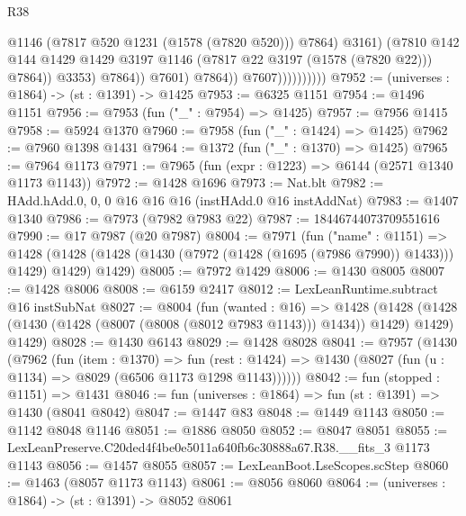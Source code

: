 \begin{lexlean}{R38}
\begin{coremodule}
                                          @1146
                                          (@7817 @520 @1231 (@1578 (@7820 @520)))
                                          @7864)
                                        @3161)
                                      (@7810
                                        @142
                                        @144
                                        @1429
                                        @1429
                                        @3197
                                        @1146
                                        (@7817 @22 @3197 (@1578 (@7820 @22)))
                                        @7864))
                                    @3353)
                                  @7864))
                              @7601)
                            @7864))
                        @7607))))))))))
@7952 := (universes : @1864) -> (st : @1391) -> @1425
@7953 := @6325 @1151
@7954 := @1496 @1151
@7956 := @7953 (fun ("_" : @7954) => @1425)
@7957 := @7956 @1415
@7958 := @5924 @1370
@7960 := @7958 (fun ("_" : @1424) => @1425)
@7962 := @7960 @1398 @1431
@7964 := @1372 (fun ("_" : @1370) => @1425)
@7965 := @7964 @1173
@7971 := @7965 (fun (expr : @1223) => @6144 (@2571 @1340 @1173 @1143))
@7972 := @1428 @1696
@7973 := Nat.blt
@7982 := HAdd.hAdd.{0, 0, 0} @16 @16 @16 (instHAdd.{0} @16 instAddNat)
@7983 := @1407 @1340
@7986 := @7973 (@7982 @7983 @22)
@7987 := 18446744073709551616
@7990 := @17 @7987 (@20 @7987)
@8004 := @7971
    (fun ("name" : @1151) =>
    @1428 (@1428 (@1428 (@1430 (@7972 (@1428 (@1695 (@7986 @7990)) @1433))) @1429) @1429) @1429)
@8005 := @7972 @1429
@8006 := @1430 @8005
@8007 := @1428 @8006
@8008 := @6159 @2417
@8012 := LexLeanRuntime.subtract @16 instSubNat
@8027 := @8004
    (fun (wanted : @16) =>
    @1428
      (@1428 (@1428 (@1430 (@1428 (@8007 (@8008 (@8012 @7983 @1143))) @1434)) @1429) @1429)
      @1429)
@8028 := @1430 @6143
@8029 := @1428 @8028
@8041 := @7957
    (@1430
      (@7962
        (fun (item : @1370) =>
        fun (rest : @1424) => @1430 (@8027 (fun (u : @1134) => @8029 (@6506 @1173 @1298 @1143))))))
@8042 := fun (stopped : @1151) => @1431
@8046 := fun (universes : @1864) => fun (st : @1391) => @1430 (@8041 @8042)
@8047 := @1447 @83
@8048 := @1449 @1143
@8050 := @1142 @8048 @1146
@8051 := @1886 @8050
@8052 := @8047 @8051
@8055 := LexLeanPreserve.C20ded4f4be0e5011a640fb6c30888a67.R38.__fits_3 @1173 @1143
@8056 := @1457 @8055
@8057 := LexLeanBoot.LseScopes.scStep
@8060 := @1463 (@8057 @1173 @1143)
@8061 := @8056 @8060
@8064 := (universes : @1864) -> (st : @1391) -> @8052 @8061

\end{coremodule}
\end{lexlean}
